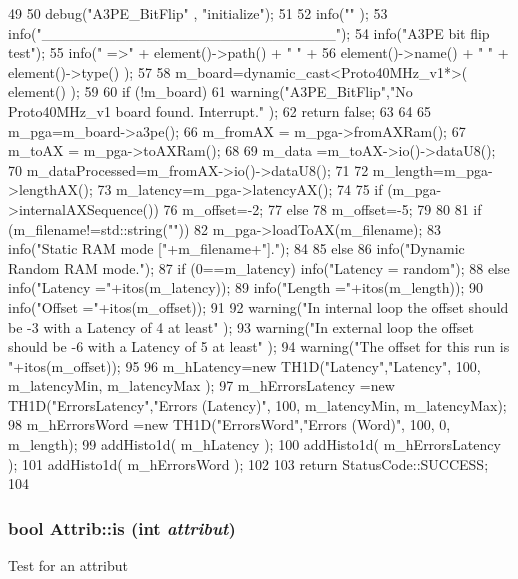 \begin{DoxyCode}
49                                       {
50   debug("A3PE_BitFlip" , "initialize");
51 
52   info("" );
53   info("____________________________");
54   info("A3PE bit flip test");
55   info(" =>" + element()->path() + " " +
56       element()->name() + " " + element()->type() );
57 
58   m_board=dynamic_cast<Proto40MHz_v1*>( element() );
59 
60   if (!m_board){
61     warning("A3PE_BitFlip","No Proto40MHz_v1 board found. Interrupt."  );
62     return false;
63   }
64 
65   m_pga=m_board->a3pe();
66   m_fromAX = m_pga->fromAXRam();
67   m_toAX   = m_pga->toAXRam();
68 
69   m_data         =m_toAX->io()->dataU8();
70   m_dataProcessed=m_fromAX->io()->dataU8();
71 
72   m_length=m_pga->lengthAX();
73   m_latency=m_pga->latencyAX();
74 
75   if (m_pga->internalAXSequence()){
76     m_offset=-2;}
77   else {
78     m_offset=-5;
79   }
80 
81   if (m_filename!=std::string("")){
82       m_pga->loadToAX(m_filename);
83       info("Static RAM mode ["+m_filename+"].");
84   }
85   else
86     info("Dynamic Random RAM mode.");
87   if (0==m_latency) info("Latency = random");
88   else info("Latency ="+itos(m_latency));
89   info("Length  ="+itos(m_length));
90   info("Offset  ="+itos(m_offset));
91 
92   warning("In internal loop the offset should be -3 with a Latency of 4 at least"
      ); 
93   warning("In external loop the offset should be -6 with a Latency of 5 at least"
      ); 
94   warning("The offset for this run is "+itos(m_offset));
95 
96   m_hLatency=new TH1D("Latency","Latency", 100, m_latencyMin, m_latencyMax );
97   m_hErrorsLatency =new TH1D("ErrorsLatency","Errors (Latency)", 100, 
      m_latencyMin, m_latencyMax);
98   m_hErrorsWord =new TH1D("ErrorsWord","Errors (Word)", 100, 0, m_length);
99   addHisto1d( m_hLatency );
100   addHisto1d( m_hErrorsLatency );
101   addHisto1d( m_hErrorsWord );
102 
103   return StatusCode::SUCCESS;
104 }
\end{DoxyCode}
\hypertarget{classAttrib_a704f26af560909ad22065083bb7d4c34}{
\subsubsection[{is}]{\setlength{\rightskip}{0pt plus 5cm}bool Attrib::is (int {\em attribut})}}
\label{classAttrib_a704f26af560909ad22065083bb7d4c34}
Test for an attribut 

